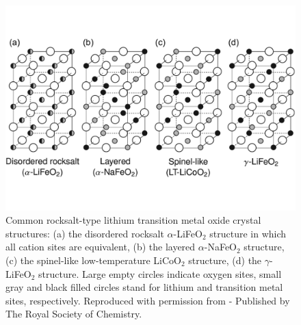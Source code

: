 \documentclass[../main.tex]{subfiles}
\begin{document}
\begin{figure}
    \centering
    \includegraphics[scale=0.4]{figures/structures.pdf}
    \caption{Common rocksalt-type lithium transition metal oxide crystal structures: (a) the disordered rocksalt $\alpha$-LiFeO$_2$ structure in which all cation sites are equivalent, (b) the layered $\alpha$-NaFeO$_2$ structure, (c) the spinel-like low-temperature LiCoO$_2$ structure, (d) the $\gamma$-LiFeO$_2$ structure. Large empty circles indicate oxygen sites, small gray and black filled circles stand for lithium and transition metal sites, respectively. Reproduced with permission from \citeauthor{clement2020} \cite{clement2020} - Published by The Royal Society of Chemistry.}
    \label{fig:structure}
\end{figure}
\end{document}
